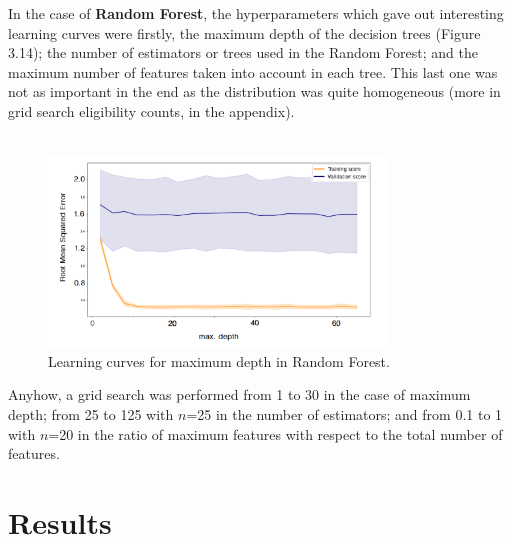 In the case of \textbf{Random Forest}, the hyperparameters which gave out interesting learning curves were firstly, the maximum depth of the decision trees (Figure 3.14); the number of estimators or trees used in the Random Forest; and the maximum number of features taken into account in each tree. This last one was not as important in the end as the distribution was quite homogeneous (more in grid search eligibility counts, in the appendix).\\\\
\begin{figure}
    \centering
    \includegraphics[width=0.8\textwidth]{Images/Results/Hyperparameter/maxdepth.png}
    \caption{Learning curves for maximum depth in Random Forest.}
\end{figure}
Anyhow, a grid search was performed from 1 to 30 in the case of maximum depth; from 25 to 125 with $n$=25 in the number of estimators; and from 0.1 to 1 with $n$=20 in the ratio of maximum features with respect to the total number of features. 


\section{Results}

